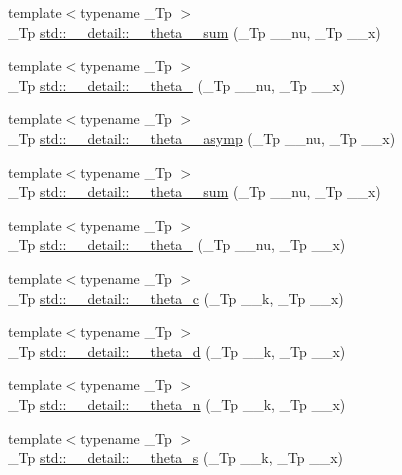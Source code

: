 \begin{DoxyCompactItemize}
{\footnotesize template$<$typename \+\_\+\+Tp $>$ }\\\+\_\+\+Tp \hyperlink{namespacestd_1_1____detail_af434f6a07d92577f40f352aa3d44483c}{std\+::\+\_\+\+\_\+detail\+::\+\_\+\+\_\+theta\+\_\+\_\+sum} (\+\_\+\+Tp \+\_\+\+\_\+nu, \+\_\+\+Tp \+\_\+\+\_\+x)
\item 
{\footnotesize template$<$typename \+\_\+\+Tp $>$ }\\\+\_\+\+Tp \hyperlink{namespacestd_1_1____detail_a6f965c639307555e5979b954a11ca0b8}{std\+::\+\_\+\+\_\+detail\+::\+\_\+\+\_\+theta\+\_} (\+\_\+\+Tp \+\_\+\+\_\+nu, \+\_\+\+Tp \+\_\+\+\_\+x)
\item 
{\footnotesize template$<$typename \+\_\+\+Tp $>$ }\\\+\_\+\+Tp \hyperlink{namespacestd_1_1____detail_a975a9a52a8a483849dd0877c24ca5d74}{std\+::\+\_\+\+\_\+detail\+::\+\_\+\+\_\+theta\+\_\+\_\+asymp} (\+\_\+\+Tp \+\_\+\+\_\+nu, \+\_\+\+Tp \+\_\+\+\_\+x)
\item 
{\footnotesize template$<$typename \+\_\+\+Tp $>$ }\\\+\_\+\+Tp \hyperlink{namespacestd_1_1____detail_a3dc1b5188464b81b6acbb2983ef0f77c}{std\+::\+\_\+\+\_\+detail\+::\+\_\+\+\_\+theta\+\_\+\_\+sum} (\+\_\+\+Tp \+\_\+\+\_\+nu, \+\_\+\+Tp \+\_\+\+\_\+x)
\item 
{\footnotesize template$<$typename \+\_\+\+Tp $>$ }\\\+\_\+\+Tp \hyperlink{namespacestd_1_1____detail_a274d3801b84bcaad13c274c8bab32bcc}{std\+::\+\_\+\+\_\+detail\+::\+\_\+\+\_\+theta\+\_} (\+\_\+\+Tp \+\_\+\+\_\+nu, \+\_\+\+Tp \+\_\+\+\_\+x)
\item 
{\footnotesize template$<$typename \+\_\+\+Tp $>$ }\\\+\_\+\+Tp \hyperlink{namespacestd_1_1____detail_af95cdf16bfcf6c138d621b0c518a3299}{std\+::\+\_\+\+\_\+detail\+::\+\_\+\+\_\+theta\+\_\+c} (\+\_\+\+Tp \+\_\+\+\_\+k, \+\_\+\+Tp \+\_\+\+\_\+x)
\item 
{\footnotesize template$<$typename \+\_\+\+Tp $>$ }\\\+\_\+\+Tp \hyperlink{namespacestd_1_1____detail_ad4ca29063a2f624e185592497d37a670}{std\+::\+\_\+\+\_\+detail\+::\+\_\+\+\_\+theta\+\_\+d} (\+\_\+\+Tp \+\_\+\+\_\+k, \+\_\+\+Tp \+\_\+\+\_\+x)
\item 
{\footnotesize template$<$typename \+\_\+\+Tp $>$ }\\\+\_\+\+Tp \hyperlink{namespacestd_1_1____detail_aace76210c8f70761bb14ab602b88d027}{std\+::\+\_\+\+\_\+detail\+::\+\_\+\+\_\+theta\+\_\+n} (\+\_\+\+Tp \+\_\+\+\_\+k, \+\_\+\+Tp \+\_\+\+\_\+x)
\item 
{\footnotesize template$<$typename \+\_\+\+Tp $>$ }\\\+\_\+\+Tp \hyperlink{namespacestd_1_1____detail_aeac5da2d394fafe6432871abf5c05413}{std\+::\+\_\+\+\_\+detail\+::\+\_\+\+\_\+theta\+\_\+s} (\+\_\+\+Tp \+\_\+\+\_\+k, \+\_\+\+Tp \+\_\+\+\_\+x)
\end{DoxyCompactItemize}


